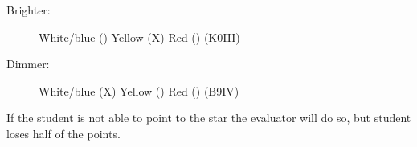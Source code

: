 
\begin{description}
\item[Brighter:] White/blue (\quad) \qquad Yellow (X) \qquad
  Red (\quad) \hfill (K0III)
\item[Dimmer:] White/blue (X) \qquad Yellow (\quad) \qquad
  Red (\quad) \hfill (B9IV)
\end{description}

If the student is not able to point to the star the evaluator will do so, but
student loses half of the points.
